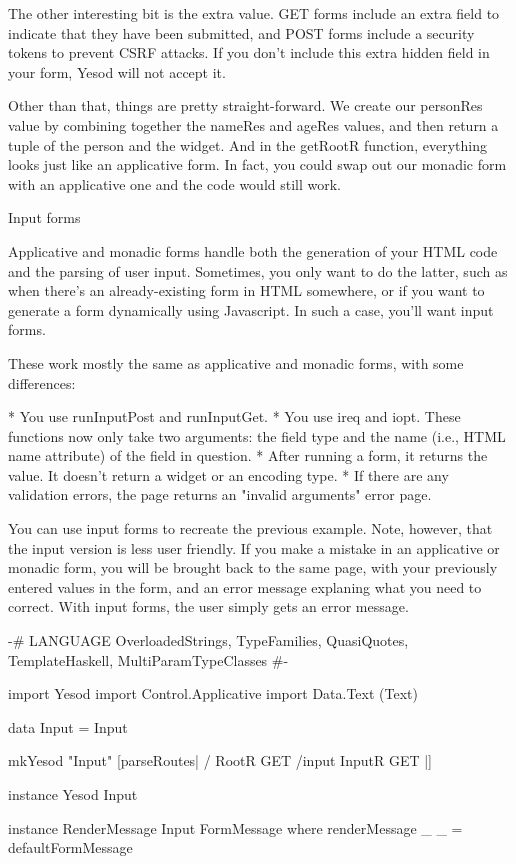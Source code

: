 The other interesting bit is the extra value. GET forms include an extra field to indicate that they have been submitted, and POST forms include a security tokens to prevent CSRF attacks. If you don't include this extra hidden field in your form, Yesod will not accept it.

Other than that, things are pretty straight-forward. We create our personRes value by combining together the nameRes and ageRes values, and then return a tuple of the person and the widget. And in the getRootR function, everything looks just like an applicative form. In fact, you could swap out our monadic form with an applicative one and the code would still work.

Input forms

Applicative and monadic forms handle both the generation of your HTML code and the parsing of user input. Sometimes, you only want to do the latter, such as when there's an already-existing form in HTML somewhere, or if you want to generate a form dynamically using Javascript. In such a case, you'll want input forms.

These work mostly the same as applicative and monadic forms, with some differences:

* You use runInputPost and runInputGet.
* You use ireq and iopt. These functions now only take two arguments: the field type and the name (i.e., HTML name attribute) of the field in question.
* After running a form, it returns the value. It doesn't return a widget or an encoding type.
* If there are any validation errors, the page returns an "invalid arguments" error page.

You can use input forms to recreate the previous example. Note, however, that the input version is less user friendly. If you make a mistake in an applicative or monadic form, you will be brought back to the same page, with your previously entered values in the form, and an error message explaning what you need to correct. With input forms, the user simply gets an error message.

{-# LANGUAGE OverloadedStrings, TypeFamilies, QuasiQuotes,
             TemplateHaskell, MultiParamTypeClasses #-}

import Yesod
import Control.Applicative
import Data.Text (Text)

data Input = Input

mkYesod "Input" [parseRoutes|
/ RootR GET
/input InputR GET
|]

instance Yesod Input

instance RenderMessage Input FormMessage where
    renderMessage _ _ = defaultFormMessage

